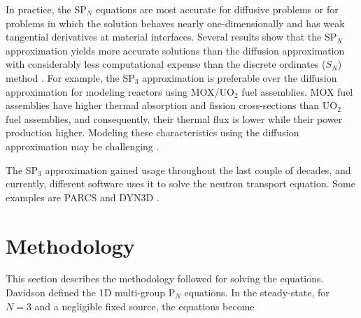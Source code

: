\documentclass{anstrans}
\begin{document}
In practice, the SP$_N$ equations are most accurate for diffusive problems or for problems in which the solution behaves nearly one-dimensionally and has weak tangential derivatives at material interfaces.
Several results show that the SP$_N$ approximation yields more accurate solutions than the diffusion approximation \cite{mui_modified_1987} \cite{beckert_development_2007} \cite{ryu_finite_2013} with considerably less computational expense than the discrete ordinates ($S_N$) method \cite{brantley_simplifiedP3_2000}.
For example, the SP$_3$ approximation is preferable over the diffusion approximation for modeling reactors using MOX/UO$_2$ fuel assemblies.
MOX fuel assemblies have higher thermal absorption and fission cross-sections than UO$_2$ fuel assemblies, and consequently, their thermal flux is lower while their power production higher.
Modeling these characteristics using the diffusion approximation may be challenging \cite{brantley_simplifiedP3_2000} \cite{capilla_applications_2009}.

The SP$_3$ approximation gained usage throughout the last couple of decades, and currently, different software uses it to solve the neutron transport equation.
Some examples are PARCS \cite{downar_parcs_2004} and DYN3D \cite{beckert_development_2007}.

\section{Methodology}

This section describes the methodology followed for solving the equations.
Davidson \cite{davidson_neutron_1957} defined the 1D multi-group P$_N$ equations.
In the steady-state, for $N=3$ and a negligible fixed source, the equations become
\end{document}

